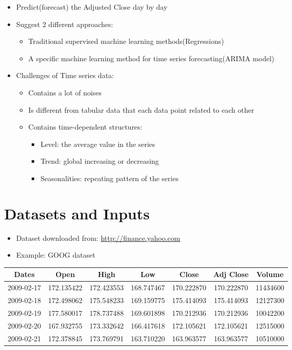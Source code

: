 \documentclass[11pt]{article}
\providecommand{\tightlist}{%
      \setlength{\itemsep}{0pt}\setlength{\parskip}{0pt}}
\begin{document}
\begin{itemize}
\tightlist
\item
  Predict(forecast) the Adjusted Close day by day
\item
  Suggest 2 different approaches:

  \begin{itemize}
  \tightlist
  \item
    Traditional supervised machine learning methods(Regressions)
  \item
    A specific machine learning method for time series forecasting(ARIMA
    model)
  \end{itemize}
\item
  Challenges of Time series data:

  \begin{itemize}
  \tightlist
  \item
    Contains a lot of noises
  \item
    Is different from tabular data that each data point related to each
    other
  \item
    Contains time-dependent structures:

    \begin{itemize}
    \tightlist
    \item
      Level: the average value in the series
    \item
      Trend: global increasing or decreasing
    \item
      Seasonalities: repeating pattern of the series
    \end{itemize}
  \end{itemize}
\end{itemize}

\section{Datasets and Inputs}\label{datasets-and-inputs}

\begin{itemize}
\tightlist
\item
  Dataset downloaded from: \url{http://finance.yahoo.com}
\item
  Example: GOOG dataset
\end{itemize}

\begin{longtable}[]{@{}ccccccc@{}}
\toprule
\textbf{Dates} & \textbf{Open} & \textbf{High} & \textbf{Low} &
\textbf{Close} & \textbf{Adj Close} & \textbf{Volume}\tabularnewline
\midrule
\endhead
2009-02-17 & 172.135422 & 172.423553 & 168.747467 & 170.222870 &
170.222870 & 11434600\tabularnewline
2009-02-18 & 172.498062 & 175.548233 & 169.159775 & 175.414093 &
175.414093 & 12127300\tabularnewline
2009-02-19 & 177.580017 & 178.737488 & 169.601898 & 170.212936 &
170.212936 & 10042200\tabularnewline
2009-02-20 & 167.932755 & 173.332642 & 166.417618 & 172.105621 &
172.105621 & 12515000\tabularnewline
2009-02-21 & 172.378845 & 173.769791 & 163.710220 & 163.963577 &
163.963577 & 10510000\tabularnewline
\bottomrule
\end{longtable}
\end{document}
